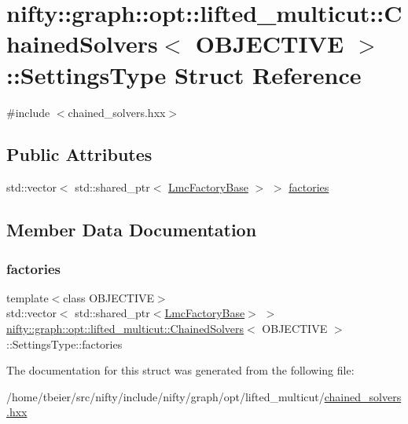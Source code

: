 \hypertarget{structnifty_1_1graph_1_1opt_1_1lifted__multicut_1_1ChainedSolvers_1_1SettingsType}{}\section{nifty\+:\+:graph\+:\+:opt\+:\+:lifted\+\_\+multicut\+:\+:Chained\+Solvers$<$ O\+B\+J\+E\+C\+T\+I\+VE $>$\+:\+:Settings\+Type Struct Reference}
\label{structnifty_1_1graph_1_1opt_1_1lifted__multicut_1_1ChainedSolvers_1_1SettingsType}


{\ttfamily \#include $<$chained\+\_\+solvers.\+hxx$>$}

\subsection*{Public Attributes}
\begin{DoxyCompactItemize}
\item 
std\+::vector$<$ std\+::shared\+\_\+ptr$<$ \hyperlink{classnifty_1_1graph_1_1opt_1_1lifted__multicut_1_1ChainedSolvers_a2fcd33b5ef677b2f9a74d3e1eb8370f3}{Lmc\+Factory\+Base} $>$ $>$ \hyperlink{structnifty_1_1graph_1_1opt_1_1lifted__multicut_1_1ChainedSolvers_1_1SettingsType_a869ff1ad63a593bc98de288d1fe4fc66}{factories}
\end{DoxyCompactItemize}


\subsection{Member Data Documentation}
\mbox{\label{structnifty_1_1graph_1_1opt_1_1lifted__multicut_1_1ChainedSolvers_1_1SettingsType_a869ff1ad63a593bc98de288d1fe4fc66}} 
\subsubsection{\texorpdfstring{factories}{factories}}
{\footnotesize\ttfamily template$<$class O\+B\+J\+E\+C\+T\+I\+VE$>$ \\
std\+::vector$<$ std\+::shared\+\_\+ptr$<$\hyperlink{classnifty_1_1graph_1_1opt_1_1lifted__multicut_1_1ChainedSolvers_a2fcd33b5ef677b2f9a74d3e1eb8370f3}{Lmc\+Factory\+Base}$>$ $>$ \hyperlink{classnifty_1_1graph_1_1opt_1_1lifted__multicut_1_1ChainedSolvers}{nifty\+::graph\+::opt\+::lifted\+\_\+multicut\+::\+Chained\+Solvers}$<$ O\+B\+J\+E\+C\+T\+I\+VE $>$\+::Settings\+Type\+::factories}



The documentation for this struct was generated from the following file\+:\begin{DoxyCompactItemize}
\item 
/home/tbeier/src/nifty/include/nifty/graph/opt/lifted\+\_\+multicut/\hyperlink{lifted__multicut_2chained__solvers_8hxx}{chained\+\_\+solvers.\+hxx}\end{DoxyCompactItemize}
